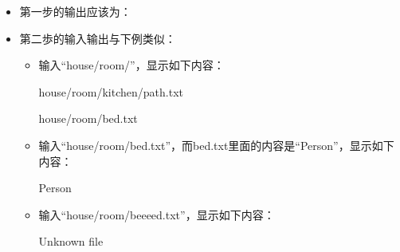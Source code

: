 \documentclass[a4paper]{article}
\begin{document}
\begin{itemize}
	\item 第一步的输出应该为：
	


	\item 第二歩的输入输出与下例类似：
	\begin {itemize}
		\item 输入“house/room/”，显示如下内容：
		
		house/room/kitchen/path.txt
		
		house/room/bed.txt
		\item 输入“house/room/bed.txt”，而bed.txt里面的内容是“Person”，显示如下内容：
		
		Person
		\item 输入“house/room/beeeed.txt”，显示如下内容：
		
		Unknown file
	\end {itemize}
\end{itemize}
\end{document}
